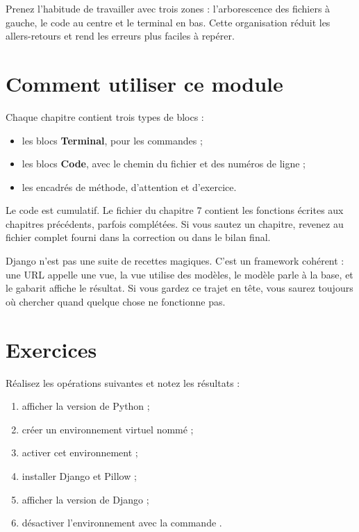 \begin{bonne}
Prenez l'habitude de travailler avec trois zones : l'arborescence des fichiers à
gauche, le code au centre et le terminal en bas. Cette organisation réduit les
allers-retours et rend les erreurs plus faciles à repérer.
\end{bonne}

\section{Comment utiliser ce module}

Chaque chapitre contient trois types de blocs :
\begin{itemize}
  \item les blocs \textbf{Terminal}, pour les commandes ;
  \item les blocs \textbf{Code}, avec le chemin du fichier et des numéros de ligne ;
  \item les encadrés de méthode, d'attention et d'exercice.
\end{itemize}

Le code est cumulatif. Le fichier  du chapitre 7 contient
les fonctions écrites aux chapitres précédents, parfois complétées. Si vous sautez
un chapitre, revenez au fichier complet fourni dans la correction ou dans le bilan
final.

\begin{retenir}
Django n'est pas une suite de recettes magiques. C'est un framework cohérent :
une URL appelle une vue, la vue utilise des modèles, le modèle parle à la base, et
le gabarit affiche le résultat. Si vous gardez ce trajet en tête, vous saurez
toujours où chercher quand quelque chose ne fonctionne pas.
\end{retenir}

\section{Exercices}

\begin{exercice}
Réalisez les opérations suivantes et notez les résultats :
\begin{enumerate}
  \item afficher la version de Python ;
  \item créer un environnement virtuel nommé  ;
  \item activer cet environnement ;
  \item installer Django et Pillow ;
  \item afficher la version de Django ;
  \item désactiver l'environnement avec la commande .
\end{enumerate}
\end{exercice}

